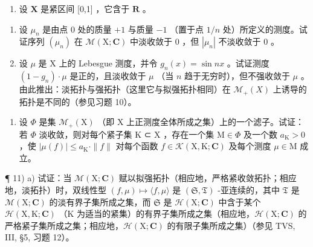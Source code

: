 \begin{enumerate}
\def\labelenumi{\arabic{enumi})}
\setcounter{enumi}{8}
\tightlist
\item
  设 \(\mathbf{X}\) 是紧区间 {[}0,1{]} ，它含于 \(\mathbf{R}\) 。
\end{enumerate}

\begin{enumerate}
\def\labelenumi{\alph{enumi})}
\item
  设 \(\mu_{n}\) 是由点 0 处的质量 \(+1\) 与质量 \(-1\) （置于点 \(1/n\) 处）所定义的测度。试证序列 \((\mu_{n})\) 在 \(\mathcal{M}(\mathrm{X};\mathbf{C})\) 中淡收敛于 0 ，但 \(|\mu_n|\) 不淡收敛于 0 。
\item
  设 \(\mu\) 是 X 上的 Lebesgue 测度，并令 \(g_{n}(x) = \sin nx\) 。试证测度 \((1 - g_{n}) \cdot \mu\) 是正的，且淡收敛于 \(\mu\) （当 \(n\) 趋于无穷时），但不强收敛于 \(\mu\) 。由此推出：淡拓扑与强拓扑（这里它与拟强拓扑相同）在 \(\mathcal{M}_{+}(X)\) 上诱导的拓扑是不同的（参见习题 10）。
\end{enumerate}

\begin{enumerate}
\def\labelenumi{\arabic{enumi})}
\setcounter{enumi}{9}
\tightlist
\item
  设 \(\Phi\) 是集 \(\mathcal{M}_{+}(\mathrm{X})\) （即 \(\mathrm{X}\) 上正测度全体所成之集）上的一个滤子。试证：若 \(\Phi\) 淡收敛，则对每个紧子集 \(\mathrm{K}\) ⊂ \(\mathrm{X}\) ，存在一个集 \(\mathrm{M} \in \Phi\) 及一个数 \(a_{\mathrm{K}} > 0\) ，使 \(|\mu(f)| \leqslant a_{\mathrm{K}} \cdot \|f\|\) 对每个函数 \(f \in \mathcal{K}(\mathrm{X}, \mathrm{K}; \mathbf{C})\) 及每个测度 \(\mu \in \mathrm{M}\) 成立。
\end{enumerate}

¶ 11) a) 试证：当 \(\mathcal{M}(\mathrm{X};\mathbf{C})\) 赋以拟强拓扑（相应地，严格紧收敛拓扑；相应地，淡拓扑）时，双线性型 \((f,\mu)\mapsto\langle f,\mu\rangle\) 是 \((\mathfrak{S},\mathfrak{T})\) -亚连续的，其中 \(\mathfrak{T}\) 是 \(\mathcal{M}(\mathrm{X};\mathbf{C})\) 的淡有界子集所成之集，而 \(\mathfrak{S}\) 是 \(\mathcal{H}(\mathrm{X};\mathbf{C})\) 中含于某个 \(\mathcal{H}(\mathrm{X},\mathrm{K};\mathbf{C})\) （K 为适当的紧集）的有界子集所成之集（相应地，\(\mathcal{H}(\mathrm{X};\mathbf{C})\) 的严格紧子集所成之集；相应地，\(\mathcal{H}(\mathrm{X};\mathbf{C})\) 的有限子集所成之集）（参见 TVS, III, §5, 习题 12）。

